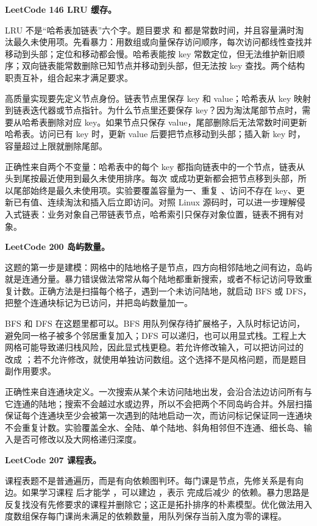 \noindent\textbf{LeetCode 146 LRU 缓存。}

LRU 不是“哈希表加链表”六个字。题目要求  和  都是常数时间，并且容量满时淘汰最久未使用项。先看暴力：用数组或向量保存访问顺序，每次访问都线性查找并移动到头部；定位和移动都会慢。哈希表能按 key 常数定位，但无法维护新旧顺序；双向链表能常数删除已知节点并移动到头部，但无法按 key 查找。两个结构职责互补，组合起来才满足要求。

高质量实现要先定义节点身份。链表节点里保存 key 和 value；哈希表从 key 映射到链表迭代器或节点指针。为什么节点里还要保存 key？因为淘汰尾部节点时，需要从哈希表删除对应 key。如果节点只保存 value，尾部删除后无法常数时间更新哈希表。访问已有 key 时，更新 value 后要把节点移动到头部；插入新 key 时，容量超过上限就删除尾部。

正确性来自两个不变量：哈希表中的每个 key 都指向链表中的一个节点，链表从头到尾按最近使用到最久未使用排序。每次  或成功更新都会把节点移到头部，所以尾部始终是最久未使用项。实验要覆盖容量为一、重复 、访问不存在 key、更新已有值、连续淘汰和插入后立即访问。对照 Linux 源码时，可以进一步理解侵入式链表：业务对象自己带链表节点，哈希索引只保存对象位置，链表不拥有对象。

\noindent\textbf{LeetCode 200 岛屿数量。}

这题的第一步是建模：网格中的陆地格子是节点，四方向相邻陆地之间有边，岛屿就是连通分量。暴力错误做法常常从每个陆地都重新搜索，或者不标记访问导致重复计数。正确方法是扫描每个格子，遇到一个未访问陆地，就启动 BFS 或 DFS，把整个连通块标记为已访问，并把岛屿数量加一。

BFS 和 DFS 在这题里都可以。BFS 用队列保存待扩展格子，入队时标记访问，避免同一格子被多个邻居重复加入；DFS 可以递归，也可以用显式栈。工程上大网格可能导致递归栈风险，因此显式栈更稳。若允许修改输入，可以把访问过的  改成 ；若不允许修改，就使用单独访问数组。这个选择不是风格问题，而是题目副作用要求。

正确性来自连通块定义。一次搜索从某个未访问陆地出发，会沿合法边访问所有与它连通的陆地；搜索不会越过水或边界，所以不会把两个不同岛屿合并。外层扫描保证每个连通块至少会被第一次遇到的陆地启动一次，而访问标记保证同一连通块不会重复计数。实验覆盖全水、全陆、单个陆地、斜角相邻但不连通、细长岛、输入是否可修改以及大网格递归深度。

\noindent\textbf{LeetCode 207 课程表。}

课程表题不是普通遍历，而是有向依赖图判环。每门课是节点，先修关系是有向边。如果学习课程  后才能学 ，可以建边 ，表示  完成后减少  的依赖。暴力思路是反复找没有先修要求的课程并删除它；这正是拓扑排序的朴素模型。优化做法用入度数组保存每门课尚未满足的依赖数量，用队列保存当前入度为零的课程。

